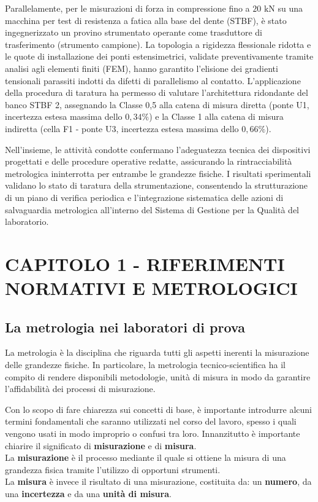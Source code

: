 \documentclass[a4paper, twoside]{article}
\begin{document}
Parallelamente, per le misurazioni di forza in compressione fino a $20 \text{ kN}$ su una macchina per test di resistenza a fatica alla base del dente (STBF), è stato ingegnerizzato un provino strumentato operante come trasduttore di trasferimento (strumento campione). La topologia a rigidezza flessionale ridotta e le quote di installazione dei ponti estensimetrici, validate preventivamente tramite analisi agli elementi finiti (FEM), hanno garantito l'elisione dei gradienti tensionali parassiti indotti da difetti di parallelismo al contatto. L'applicazione della procedura di taratura ha permesso di valutare l'architettura ridondante del banco STBF 2, assegnando la Classe 0,5 alla catena di misura diretta (ponte U1, incertezza estesa massima dello $0,34\%$) e la Classe 1 alla catena di misura indiretta (cella F1 - ponte U3, incertezza estesa massima dello $0,66\%$).\par

Nell'insieme, le attività condotte confermano l'adeguatezza tecnica dei dispositivi progettati e delle procedure operative redatte, assicurando la rintracciabilità metrologica ininterrotta per entrambe le grandezze fisiche. I risultati sperimentali validano lo stato di taratura della strumentazione, consentendo la strutturazione di un piano di verifica periodica e l'integrazione sistematica delle azioni di salvaguardia metrologica all'interno del Sistema di Gestione per la Qualità del laboratorio.



    \newpage

\section{CAPITOLO 1 - RIFERIMENTI NORMATIVI E METROLOGICI}



\subsection{La metrologia nei laboratori di prova}
La metrologia è la disciplina che riguarda tutti gli aspetti inerenti la misurazione delle grandezze fisiche. 
In particolare, la metrologia tecnico-scientifica ha il compito di rendere disponibili metodologie, unità di misura in modo da garantire l'affidabilità dei processi di misurazione.\par

Con lo scopo di fare chiarezza sui concetti di base, è importante introdurre alcuni termini fondamentali che saranno utilizzati nel corso del lavoro, spesso i quali vengono usati in modo improprio o confusi tra loro.
Innanzitutto è importante chiarire il significato di \textbf{misurazione} e di \textbf{misura}.\\
La \textbf{misurazione} è il processo mediante il quale si ottiene la misura di una grandezza fisica tramite l'utilizzo di opportuni strumenti.\\
La \textbf{misura} è invece il risultato di una misurazione, costituita da: un \textbf{numero}, da una \textbf{incertezza} e da una \textbf{unità di misura}.\par
\end{document}
